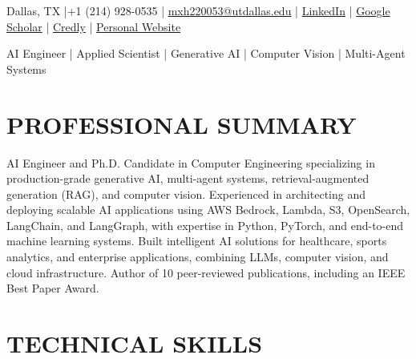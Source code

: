 \documentclass[10pt,a4paper,sans]{moderncv}
\begin{document}
\makecvtitle
\vspace*{-10mm}
\begin{center}


Dallas, TX |+1 (214) 928-0535 | 
\href{mailto:mxh220053@utdallas.edu}{\color{blue} mxh220053@utdallas.edu} | 
\href{https://www.linkedin.com/in/mostafa-habibi-78b841284/}{\color{blue} LinkedIn} | 
\href{https://scholar.google.com/citations?user=dHXIkhMAAAAJ&hl=en}{\color{blue} Google Scholar} | 
\href{https://www.credly.com/users/mostafa-habibi-dehsheikhi/badges#credly}{\color{blue} Credly} | 
\href{https://habibi6010.github.io/}{\color{blue} Personal Website}

AI Engineer | Applied Scientist | Generative AI | Computer Vision | Multi-Agent Systems
\end{center}
\vspace*{-7mm}
\section{PROFESSIONAL SUMMARY}
{\justifying
AI Engineer and Ph.D. Candidate in Computer Engineering specializing in production-grade generative AI, multi-agent systems, retrieval-augmented generation (RAG), and computer vision. Experienced in architecting and deploying scalable AI applications using AWS Bedrock, Lambda, S3, OpenSearch, LangChain, and LangGraph, with expertise in Python, PyTorch, and end-to-end machine learning systems. Built intelligent AI solutions for healthcare, sports analytics, and enterprise applications, combining LLMs, computer vision, and cloud infrastructure. Author of 10 peer-reviewed publications, including an IEEE Best Paper Award.
\par}

\vspace*{-3mm}
\section{TECHNICAL SKILLS}
\end{document}
